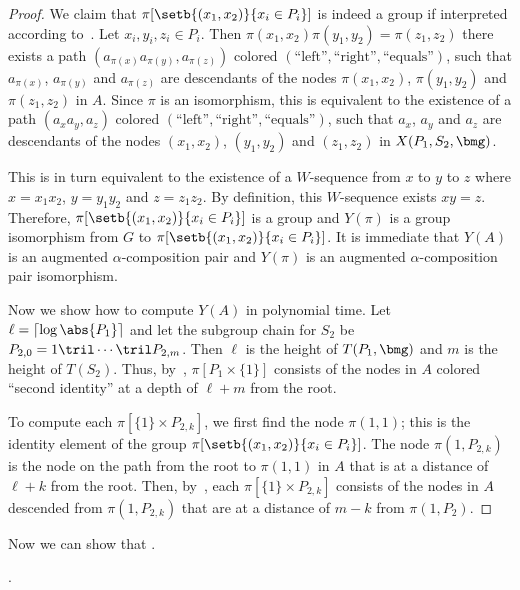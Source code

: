 \begin{proof}
  We claim that $\pi[\setb{(x_1, x_2)}{x_i \in P_i}]$ is indeed a group if interpreted according to~.  Let $x_i, y_i, z_i \in P_i$.  Then $\pi(x_1, x_2) \pi(y_1, y_2) = \pi(z_1, z_2)$ \ifft there exists a path $(a_{\pi(x)} a_{\pi(y)}, a_{\pi(z)})$ colored $(\text{``left''}, \text{``right''}, \text{``equals''})$, such that $a_{\pi(x)}$, $a_{\pi(y)}$ and $a_{\pi(z)}$ are descendants of the nodes $\pi(x_1, x_2)$, $\pi(y_1, y_2)$ and $\pi(z_1, z_2)$ in $A$.  Since $\pi$ is an isomorphism, this is equivalent to the existence of a path $(a_{x} a_{y}, a_{z})$ colored $(\text{``left''}, \text{``right''}, \text{``equals''})$, such that $a_x$, $a_y$ and $a_z$ are descendants of the nodes $(x_1, x_2)$, $(y_1, y_2)$ and $(z_1, z_2)$ in $X(P_1, S_2, \bmg)$.

  This is in turn equivalent to the existence of a $W$-sequence from $x$ to $y$ to $z$ where $x = x_1 x_2$, $y = y_1 y_2$ and $z = z_1 z_2$.  By definition, this $W$-sequence exists \ifft $x y = z$.  Therefore, $\pi[\setb{(x_1, x_2)}{x_i \in P_i}]$ is a group and $Y(\pi)$ is a group isomorphism from $G$ to $\pi[\setb{(x_1, x_2)}{x_i \in P_i}]$.  It is immediate that $Y(A)$ is an augmented $\alpha$-composition pair and $Y(\pi)$ is an augmented $\alpha$-composition pair isomorphism.

  Now we show how to compute $Y(A)$ in polynomial time.  Let $\ell = \lceil \log \abs{P_1} \rceil$ and let the subgroup chain for $S_2$ be $P_{2, 0} = 1 \tril \cdots \tril P_{2, m}$.  Then $\ell$ is the height of $T(P_1, \bmg)$ and $m$ is the height of $T(S_2)$.  Thus, by~, $\pi[P_1 \times \{1\}]$ consists of the nodes in $A$ colored ``second identity'' at a depth of $\ell + m$ from the root.

  To compute each $\pi[\{1\} \times P_{2, k}]$, we first find the node $\pi(1, 1)$; this is the identity element of the group $\pi[\setb{(x_1, x_2)}{x_i \in P_i}]$.  The node $\pi(1, P_{2, k})$ is the node on the path from the root to $\pi(1, 1)$ in $A$ that is at a distance of $\ell + k$ from the root.  Then, by~, each $\pi[\{1\} \times P_{2, k}]$ consists of the nodes in $A$ descended from $\pi(1, P_{2, k})$ that are at a distance of $m - k$ from $\pi(1, P_2)$.
\end{proof}

Now we can show that .

\begin{theorem}
  \label{thm:Y-fff}
  .
\end{theorem}

